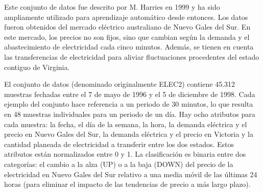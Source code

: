 Este conjunto de datos fue descrito por M. Harries \cite{electricity-dataset} en 1999 y ha sido ampliamente utilizado para aprendizaje automático desde entonces. Los datos fueron obtenidos del mercado eléctrico australiano de Nuevo Gales del Sur. En este mercado, los precios no son fijos, sino que cambian según la demanda y el abastecimiento de electricidad cada cinco minutos. Además, se tienen en cuenta las transferencias de electricidad para aliviar fluctuaciones procedentes del estado contiguo de Virginia.

El conjunto de datos (denominado originalmente ELEC2) contiene 45.312 muestras fechadas entre el 7 de mayo de 1996 y el 5 de diciembre de 1998. Cada ejemplo del conjunto hace referencia a un periodo de 30 minutos, lo que resulta en 48 muestras individuales para un periodo de un día. Hay ocho atributos para cada muestra: la fecha, el día de la semana, la hora, la demanda eléctrica y el precio en Nuevo Gales del Sur, la demanda eléctrica y el precio en Victoria y la cantidad planeada de electricidad a transferir entre los dos estados. Estos atributos están normalizados entre 0 y 1. La clasificación es binaria entre dos categorías: el cambio a la alza (UP) o a la baja (DOWN) del precio de la electricidad en Nuevo Gales del Sur relativo a una media móvil de las últimas 24 horas (para eliminar el impacto de las tendencias de precio a más largo plazo). 

